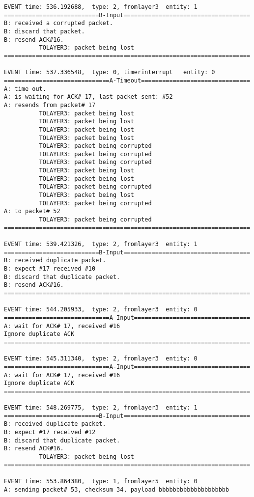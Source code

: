 \documentclass[12pt]{article}
\begin{document}
\begin{verbatim}
EVENT time: 536.192688,  type: 2, fromlayer3  entity: 1
===========================B-Input====================================
B: received a corrupted packet.
B: discard that packet.
B: resend ACK#16.
          TOLAYER3: packet being lost
======================================================================

EVENT time: 537.336548,  type: 0, timerinterrupt   entity: 0
==============================A-Timeout===============================
A: time out. 
A: is waiting for ACK# 17, last packet sent: #52
A: resends from packet# 17 
          TOLAYER3: packet being lost
          TOLAYER3: packet being lost
          TOLAYER3: packet being lost
          TOLAYER3: packet being lost
          TOLAYER3: packet being corrupted
          TOLAYER3: packet being corrupted
          TOLAYER3: packet being corrupted
          TOLAYER3: packet being lost
          TOLAYER3: packet being lost
          TOLAYER3: packet being corrupted
          TOLAYER3: packet being lost
          TOLAYER3: packet being corrupted
A: to packet# 52
          TOLAYER3: packet being corrupted
======================================================================

EVENT time: 539.421326,  type: 2, fromlayer3  entity: 1
===========================B-Input====================================
B: received duplicate packet.
B: expect #17 received #10
B: discard that duplicate packet.
B: resend ACK#16.
======================================================================

EVENT time: 544.205933,  type: 2, fromlayer3  entity: 0
==============================A-Input=================================
A: wait for ACK# 17, received #16
Ignore duplicate ACK
======================================================================

EVENT time: 545.311340,  type: 2, fromlayer3  entity: 0
==============================A-Input=================================
A: wait for ACK# 17, received #16
Ignore duplicate ACK
======================================================================

EVENT time: 548.269775,  type: 2, fromlayer3  entity: 1
===========================B-Input====================================
B: received duplicate packet.
B: expect #17 received #12
B: discard that duplicate packet.
B: resend ACK#16.
          TOLAYER3: packet being lost
======================================================================

EVENT time: 553.864380,  type: 1, fromlayer5  entity: 0
A: sending packet# 53, checksum 34, payload bbbbbbbbbbbbbbbbbbbb


\end{verbatim}
\end{document}
